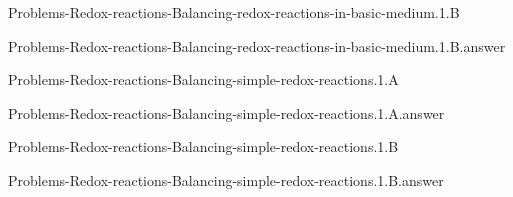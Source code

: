 \documentclass[main.tex]{subfiles}
\newcommand\chapterlabel{}
\begin{document}
\renewcommand\chapterlabel{Ch-electrolytes}
\begin{question}[ID=\the\value{numA}]
{Problems-Redox-reactions-Balancing-redox-reactions-in-basic-medium.1.B}
\end{question}
   \begin{Form}
   \TextField[multiline,backgroundcolor=gray!20,borderwidth=0,width=0.43\textwidth  ,height=115pt, name=\the\value{numA}]  { }\end{Form}
\begin{solution}
{Problems-Redox-reactions-Balancing-redox-reactions-in-basic-medium.1.B.answer}
\hspace{0.1cm}
\end{solution}


\renewcommand\chapterlabel{Ch-electrolytes}
\begin{question}[ID=\the\value{numA}]
{Problems-Redox-reactions-Balancing-simple-redox-reactions.1.A}
\end{question}
   \begin{Form}
   \TextField[multiline,backgroundcolor=gray!20,borderwidth=0,width=0.43\textwidth  ,height=115pt, name=\the\value{numA}]  { }\end{Form}
\begin{solution}
{Problems-Redox-reactions-Balancing-simple-redox-reactions.1.A.answer}
\hspace{0.1cm}
\end{solution}


\renewcommand\chapterlabel{Ch-electrolytes}
\begin{question}[ID=\the\value{numA}]
{Problems-Redox-reactions-Balancing-simple-redox-reactions.1.B}
\end{question}
   \begin{Form}
   \TextField[multiline,backgroundcolor=gray!20,borderwidth=0,width=0.43\textwidth  ,height=115pt, name=\the\value{numA}]  { }\end{Form}
\begin{solution}
{Problems-Redox-reactions-Balancing-simple-redox-reactions.1.B.answer}
\hspace{0.1cm}
\end{solution}
\end{document}
